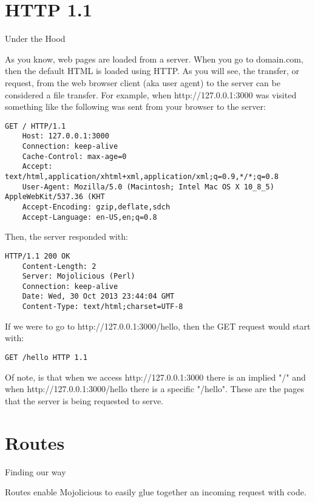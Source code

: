 \documentclass[14pt]{extreport}
\begin{document}
\section{HTTP 1.1}

{\Large Under the Hood}

As you know, web pages are loaded from a server. When you go to domain.com,
then the default HTML is loaded using HTTP.  As you will see, the transfer, or
request, from the web browser client (aka user agent) to the server can be
considered a file transfer. For example, when http://127.0.0.1:3000 was visited
something like the following was sent from your browser to the server:

\begin{lstlisting}[style=BlockStyle]
    GET / HTTP/1.1
    Host: 127.0.0.1:3000
    Connection: keep-alive
    Cache-Control: max-age=0
    Accept: text/html,application/xhtml+xml,application/xml;q=0.9,*/*;q=0.8
    User-Agent: Mozilla/5.0 (Macintosh; Intel Mac OS X 10_8_5) AppleWebKit/537.36 (KHT
    Accept-Encoding: gzip,deflate,sdch
    Accept-Language: en-US,en;q=0.8
\end{lstlisting}

Then, the server responded with:

\begin{lstlisting}[style=BlockStyle]
    HTTP/1.1 200 OK
    Content-Length: 2
    Server: Mojolicious (Perl)
    Connection: keep-alive
    Date: Wed, 30 Oct 2013 23:44:04 GMT
    Content-Type: text/html;charset=UTF-8
\end{lstlisting}

If we were to go to http://127.0.0.1:3000/hello, then the GET request would
start with:

\begin{lstlisting}[style=BlockStyle]
    GET /hello HTTP 1.1
\end{lstlisting}

Of note, is that when we access http://127.0.0.1:3000 there is an implied "/"
and when http://127.0.0.1:3000/hello there is a specific "/hello".  These are
the pages that the server is being requested to serve.

\section{Routes}

{\Large Finding our way}

Routes enable Mojolicious to easily glue together an incoming request with
code.
\end{document}
